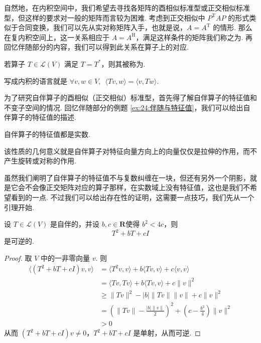 自然地，在内积空间中，我们希望去寻找各矩阵的酉相似标准型或正交相似标准型，但这样的要求对一般的矩阵而言较为困难. 考虑到正交相似中 $ P^{\mathrm{T}}AP $ 的形式类似于合同变换，我们可以先从实对称矩阵入手，也就是说，$ A = A^{\mathrm{T}} $ 的情形. 那么在复内积空间上，这一关系相应于 $ A = A^{\mathrm{H}} $，满足这样条件的矩阵我们称之为. 再回忆伴随部分的内容，我们可以得到此关系在算子上的对应.

\begin{definition}[自伴算子] 
    若算子 $ T \in \mathcal{L}(V) $ 满足 $ T = T^* $，则其被称为.
\end{definition}

写成内积的语言就是 $ \forall v, w \in V,\enspace \langle Tv, w \rangle = \langle v, Tw \rangle $.

为了研究自伴算子的酉相似（正交相似）标准型，首先得了解自伴算子的特征值和不变子空间的情况. 回忆伴随部分的例题 \autoref{ex:24:伴随与特征值}，我们可以给出自伴算子的特征值的描述.

\begin{theorem}
    自伴算子的特征值都是实数.
\end{theorem}

该性质的几何意义就是自伴算子对特征向量方向上的向量仅仅是拉伸的作用，而不产生旋转或对称的作用.

虽然我们阐明了自伴算子的特征值不与复数纠缠在一块，但还有另外一个阴影，就是它会不会像正交矩阵对应的算子那样，在实数域上没有特征值，这也是我们不希望看到的一点. 不过我们可以给出存在性的证明，这需要一点技巧，我们先从一个引理开始.

\begin{lemma} \label{lem:24:实谱定理引理1}
    设 $ T \in \mathcal{L}(V) $ 是自伴的，并设 $ b, c \in \mathbf{R} $使得 $ b^2 < 4c $，则
    \[ T^2 + bT + cI \]
    是可逆的.
\end{lemma}

\begin{proof}
    取 $ V $ 中的一非零向量 $ v $. 则
    \begin{align*}
        \langle(T^2+bT+cI)v,v\rangle & = \langle T^2v,v \rangle + b\langle Tv,v \rangle + c\langle v,v \rangle                                  \\
                                     & = \langle Tv,Tv \rangle + b\langle Tv,v \rangle + c\lVert v \rVert^2                                     \\
                                     & \geqslant \lVert Tv \rVert^2 - \lvert b \rvert \lVert Tv \rVert \lVert v \rVert +  c\lVert v \rVert^2    \\
                                     & = \left(\lVert Tv \rVert - \frac{|b| \lVert v \rVert}{2}\right)^2 + (c - \frac{b^2}{4})\lVert v \rVert^2 \\
                                     & > 0
    \end{align*}
    从而 $ (T^2 + bT + cI)v \neq 0 $，$ T^2 + bT + cI $ 是单射，从而可逆.
\end{proof}


